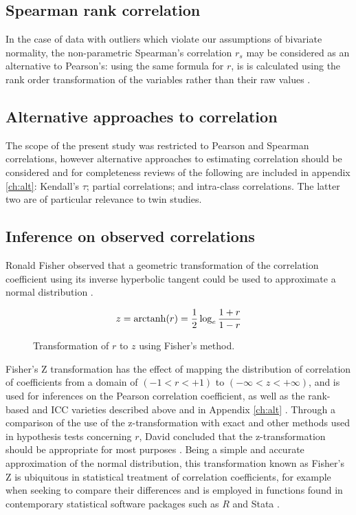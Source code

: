 \subsection{Spearman rank correlation}
 In the case of data with outliers which violate our assumptions of bivariate normality, the non-parametric Spearman's correlation $r_s$ may be considered as an alternative to Pearson's: using the same formula for $r$, is is calculated using the rank order transformation of the variables rather than their raw values \cite{Fieller1957,StataCorp2013}. 

\subsection{Alternative approaches to correlation}
The scope of the present study was restricted to Pearson and Spearman correlations, however alternative approaches to estimating correlation should be considered and for completeness reviews of the following are included in appendix \ref{ch:alt}: Kendall's $\tau$; partial correlations; and intra-class correlations.  The latter two are of particular relevance to twin studies.

\subsection{Inference on observed correlations}
Ronald Fisher observed that a geometric transformation of the correlation coefficient using its inverse hyperbolic tangent could be used to approximate a normal distribution \cite{Fisher1915}.  

$$z = \operatorname{arctanh}(r) = \frac{1}{2} \log_e \frac{1+r}{1-r}$$

\begin{figure}[htbp]
\sidecaption[t]
{}
\caption{Transformation of $r$ to $z$ using Fisher's method.}
\label{fig:ztransform}       %
\end{figure}

Fisher's Z transformation has the effect of mapping the distribution of correlation of coefficients from a domain of $(-1 < r < +1)$ to $(-\infty < z < +\infty)$, and is used for inferences on the Pearson correlation coefficient, as well as the rank-based and ICC varieties described above and in Appendix \ref{ch:alt} \cite{Fisher1990, Fieller1957, Barrett2008}.  Through a comparison of the use of the z-transformation with exact and other methods used in hypothesis tests concerning $r$, David concluded that the z-transformation should be appropriate for most purposes \cite{David1938}.  Being a simple and accurate approximation of the normal distribution, this transformation known as Fisher's Z is ubiquitous in statistical treatment of correlation coefficients, for example when seeking to compare their differences and is employed in functions found in contemporary statistical software packages such as $R$ and Stata \cite{R2018,StataCorp2013}.

